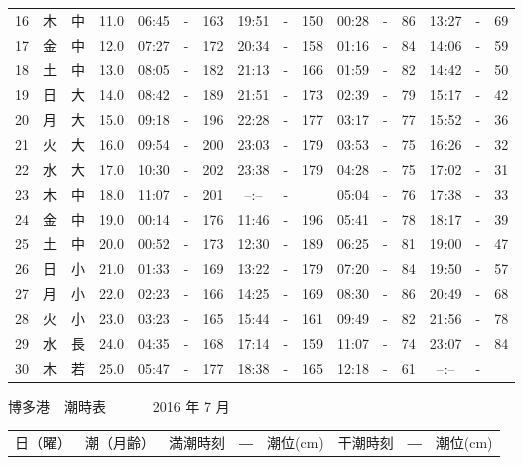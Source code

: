 \documentclass[12pt.a4j]{jsarticle}
\begin{document}
\begin{center}
\begin{table}[ht]
\begin{tabular}{|rc|cr|ccrccr|ccrccr|}
16 & 木 & 中 & 11.0 &  06:45 &-& 163  &  19:51 &-& 150  &   00:28 &-&  86  &   13:27 &-&  69  \\
17 & 金 & 中 & 12.0 &  07:27 &-& 172  &  20:34 &-& 158  &   01:16 &-&  84  &   14:06 &-&  59  \\
18 & 土 & 中 & 13.0 &  08:05 &-& 182  &  21:13 &-& 166  &   01:59 &-&  82  &   14:42 &-&  50  \\
19 & 日 & 大 & 14.0 &  08:42 &-& 189  &  21:51 &-& 173  &   02:39 &-&  79  &   15:17 &-&  42  \\
20 & 月 & 大 & 15.0 &  09:18 &-& 196  &  22:28 &-& 177  &   03:17 &-&  77  &   15:52 &-&  36  \\
21 & 火 & 大 & 16.0 &  09:54 &-& 200  &  23:03 &-& 179  &   03:53 &-&  75  &   16:26 &-&  32  \\
22 & 水 & 大 & 17.0 &  10:30 &-& 202  &  23:38 &-& 179  &   04:28 &-&  75  &   17:02 &-&  31  \\
23 & 木 & 中 & 18.0 &  11:07 &-& 201  &  --:-- &-&     &   05:04 &-&  76  &   17:38 &-&  33  \\
24 & 金 & 中 & 19.0 &  00:14 &-& 176  &  11:46 &-& 196  &   05:41 &-&  78  &   18:17 &-&  39  \\
25 & 土 & 中 & 20.0 &  00:52 &-& 173  &  12:30 &-& 189  &   06:25 &-&  81  &   19:00 &-&  47  \\
26 & 日 & 小 & 21.0 &  01:33 &-& 169  &  13:22 &-& 179  &   07:20 &-&  84  &   19:50 &-&  57  \\
27 & 月 & 小 & 22.0 &  02:23 &-& 166  &  14:25 &-& 169  &   08:30 &-&  86  &   20:49 &-&  68  \\
28 & 火 & 小 & 23.0 &  03:23 &-& 165  &  15:44 &-& 161  &   09:49 &-&  82  &   21:56 &-&  78  \\
29 & 水 & 長 & 24.0 &  04:35 &-& 168  &  17:14 &-& 159  &   11:07 &-&  74  &   23:07 &-&  84  \\
30 & 木 & 若 & 25.0 &  05:47 &-& 177  &  18:38 &-& 165  &   12:18 &-&  61  &   --:-- &-&     \\
   \hline
   \end{tabular}
\end{table}
\newpage
 {\LARGE 博多港　潮時表　　　}
 {\large 2016 年  7 月}\\
 \begin{table}[ht]
    \begin{tabular}{|rc|cr|ccrccr|ccrccr|}
    \hline
    \multicolumn{2}{|c|}{日（曜）} & \multicolumn{2}{c|}{潮（月齢）} & \multicolumn{6}{c|}{満潮時刻　―　潮位(cm)} & \multicolumn{6}{c|}{干潮時刻　―　潮位(cm)} \\

\end{tabular}
\end{table}
\end{center}
\end{document}
